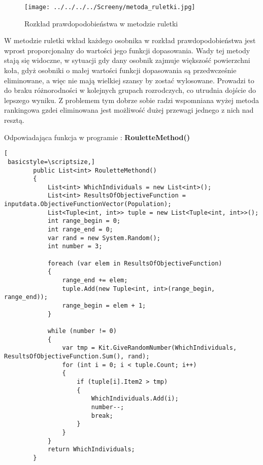 \begin{figure}[h]
		\texttt{[image: ../../../../Screeny/metoda\_ruletki.jpg]}
		\caption{Rozkład prawdopodobieństwa w metodzie ruletki}
		\label{ruletka}			
\end{figure}
\par
W metodzie ruletki wkład każdego osobnika w rozkład prawdopodobieństwa jest wprost proporcjonalny do wartości jego funkcji dopasowania. Wady tej metody stają się widoczne, w sytuacji gdy dany osobnik zajmuje większość powierzchni koła, gdyż osobniki o małej wartości funkcji dopasowania są przedwcześnie eliminowane, a więc nie mają wielkiej szansy by zostać wylosowane. Prowadzi to do braku różnorodności w kolejnych grupach rozrodczych, co utrudnia dojście do lepszego wyniku. Z problemem tym dobrze sobie radzi wspomniana wyżej metoda rankingowa gzdei eliminowana jest możliwość dużej przewagi jednego z nich nad resztą.\\
\par
Odpowiadająca funkcja w programie : \textbf{RouletteMethod()}

\begin{program}
\begin{lstlisting}[
 basicstyle=\scriptsize,]
        public List<int> RouletteMethond()
        {
            List<int> WhichIndividuals = new List<int>();
            List<int> ResultsOfObjectiveFunction = inputdata.ObjectiveFunctionVector(Population);
            List<Tuple<int, int>> tuple = new List<Tuple<int, int>>();
            int range_begin = 0;
            int range_end = 0;
            var rand = new System.Random();
            int number = 3;

            foreach (var elem in ResultsOfObjectiveFunction)
            {
                range_end += elem;
                tuple.Add(new Tuple<int, int>(range_begin, range_end));
                range_begin = elem + 1;
            }

            while (number != 0)
            {
                var tmp = Kit.GiveRandomNumber(WhichIndividuals, ResultsOfObjectiveFunction.Sum(), rand);
                for (int i = 0; i < tuple.Count; i++)
                {
                    if (tuple[i].Item2 > tmp)
                    {
                        WhichIndividuals.Add(i);
                        number--;
                        break;
                    }
                }
            }
            return WhichIndividuals;
        }
\end{lstlisting}
\end{program}

